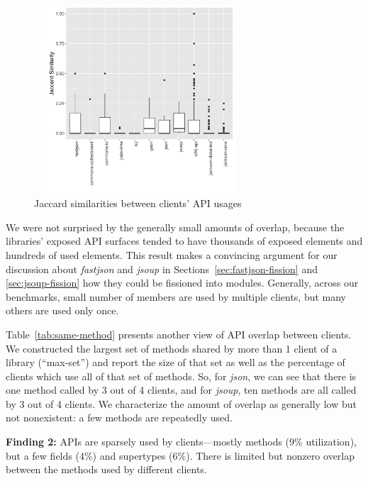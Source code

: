 \begin{center}
\begin{figure}
\centering
\includegraphics[width=8cm, height=7cm]{./images/jac-sim-box-plot-declared}
\caption{\label{fig:jaccard}Jaccard similarities between clients' API usages}
\end{figure}
\end{center}


We were not surprised by the generally small amounts of overlap, because the libraries' exposed API surfaces tended
to have thousands of exposed elements and hundreds of used elements. This result makes a convincing argument for our discussion about \emph{fastjson} and \emph{jsoup} in Sections~\ref{sec:fastjson-fission} and \ref{sec:jsoup-fission} how they could be fissioned into modules. Generally, across our benchmarks, small number of members are used by
multiple clients, but many others are used only once.

Table~\ref{tab:same-method} presents another view of API overlap between clients. We constructed the largest set
of methods shared by more than 1 client of a library (``max-set'') and report the size of that set as well as the percentage
of clients which use all of that set of methods. So, for \emph{json}, we can see that there is one method called
by 3 out of 4 clients, and for \emph{jsoup}, ten methods are all called
by 3 out of 4 clients. We characterize the amount of overlap as generally low but not
nonexistent: a few methods are repeatedly used.




\begin{mdframed}[
  leftmargin=\parindent,
  rightmargin=\parindent,
  skipabove=\topsep,
  skipbelow=\topsep
  ]
{\bf Finding 2:} APIs are sparsely used by clients---mostly methods (9\% utilization), but a few fields (4\%) and supertypes (6\%). There is limited but nonzero overlap between the methods used by different clients.
\end{mdframed}

